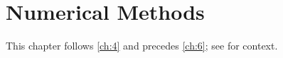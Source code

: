 \chapter{Numerical Methods}\label{ch:5}
\kant[2-11]

This chapter follows \cref{ch:4} and precedes \cref{ch:6}; see \citep{ch5-1,ch5-3} for context.
